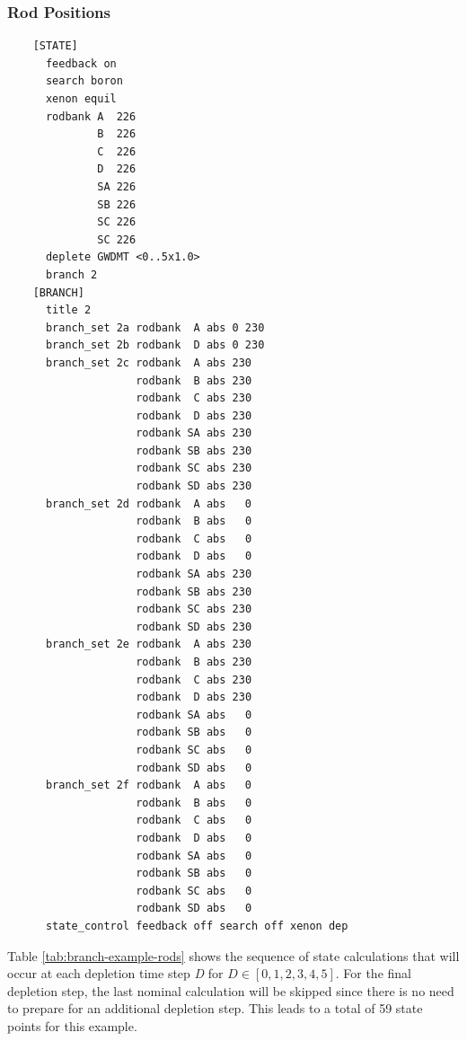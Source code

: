 \subsubsection{Rod Positions}

\begin{verbatim}
    [STATE]
      feedback on
      search boron
      xenon equil
      rodbank A  226
              B  226
              C  226
              D  226
              SA 226
              SB 226
              SC 226
              SC 226
      deplete GWDMT <0..5x1.0>
      branch 2
    [BRANCH]
      title 2
      branch_set 2a rodbank  A abs 0 230
      branch_set 2b rodbank  D abs 0 230
      branch_set 2c rodbank  A abs 230
                    rodbank  B abs 230
                    rodbank  C abs 230
                    rodbank  D abs 230
                    rodbank SA abs 230
                    rodbank SB abs 230
                    rodbank SC abs 230
                    rodbank SD abs 230
      branch_set 2d rodbank  A abs   0
                    rodbank  B abs   0
                    rodbank  C abs   0
                    rodbank  D abs   0
                    rodbank SA abs 230
                    rodbank SB abs 230
                    rodbank SC abs 230
                    rodbank SD abs 230
      branch_set 2e rodbank  A abs 230
                    rodbank  B abs 230
                    rodbank  C abs 230
                    rodbank  D abs 230
                    rodbank SA abs   0
                    rodbank SB abs   0
                    rodbank SC abs   0
                    rodbank SD abs   0
      branch_set 2f rodbank  A abs   0
                    rodbank  B abs   0
                    rodbank  C abs   0
                    rodbank  D abs   0
                    rodbank SA abs   0
                    rodbank SB abs   0
                    rodbank SC abs   0
                    rodbank SD abs   0
      state_control feedback off search off xenon dep
\end{verbatim}

Table \ref{tab:branch-example-rods} shows the sequence of state calculations that will occur at each depletion time step \emph{D} for $D \in [0, 1, 2, 3, 4, 5]$.  For the final depletion step, the last nominal calculation will be skipped since there is no need to prepare for an additional depletion step.  This leads to a total of 59 state points for this example.

